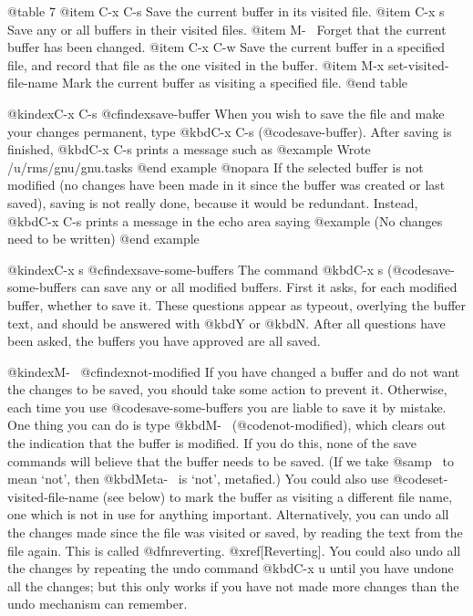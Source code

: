{{{{{{{{{{{{{{{{{{@table 7
@item C-x C-s
Save the current buffer in its visited file.
@item C-x s
Save any or all buffers in their visited files.
@item M-~
Forget that the current buffer has been changed.
@item C-x C-w
Save the current buffer in a specified file, and record that
file as the one visited in the buffer.
@item M-x set-visited-file-name
Mark the current buffer as visiting a specified file.
@end table

@kindex{C-x C-s}
@cfindex{save-buffer}
  When you wish to save the file and make your changes permanent, type
@kbd{C-x C-s} (@code{save-buffer}).  After saving is finished, @kbd{C-x C-s}
prints a message such as
@example
Wrote /u/rms/gnu/gnu.tasks
@end example
@nopara
If the selected
buffer is not modified (no changes have been made in it since the buffer
was created or last saved), saving is not really done, because it would be
redundant.  Instead, @kbd{C-x C-s} prints a message in the echo area saying
@example
(No changes need to be written)
@end example

@kindex{C-x s}
@cfindex{save-some-buffers}
  The command @kbd{C-x s} (@code{save-some-buffers} can save any or all modified
buffers.  First it asks, for each modified buffer, whether to save it.
These questions appear as typeout, overlying the buffer text, and should
be answered with @kbd{Y} or @kbd{N}.  After all questions have been asked,
the buffers you have approved are all saved.

@kindex{M-~}
@cfindex{not-modified}
  If you have changed a buffer and do not want the changes to be saved, you
should take some action to prevent it.  Otherwise, each time you use
@code{save-some-buffers} you are liable to save it by mistake.  One thing
you can do is type @kbd{M-~} (@code{not-modified}), which clears out the
indication that the buffer is modified.  If you do this, none of the save
commands will believe that the buffer needs to be saved.  (If we take
@samp{~} to mean `not', then @kbd{Meta-~} is `not', metafied.)  You could
also use @code{set-visited-file-name} (see below) to mark the buffer as
visiting a different file name, one which is not in use for anything important.
Alternatively, you can undo all the changes made since the file was visited
or saved, by reading the text from the file again.  This is called
@dfn{reverting}.  @xref[Reverting].  You could also undo all the changes by
repeating the undo command @kbd{C-x u} until you have undone all the changes;
but this only works if you have not made more changes than the undo mechanism
can remember.

}}}}}}}}}}}}}}}}}}
